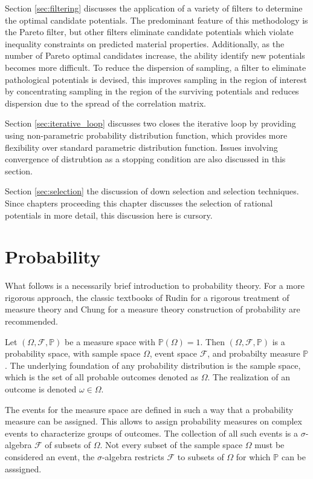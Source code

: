 Section \ref{sec:filtering} discusses the application of a variety of filters to determine the optimal candidate potentials.  The predominant feature of this methodology is the Pareto filter, but other filters eliminate candidate potentials which violate inequality constraints on predicted material properties.  Additionally, as the number of Pareto optimal candidates increase, the ability identify new potentials becomes more difficult.  To reduce the dispersion of sampling, a filter to eliminate pathological potentials is devised, this improves sampling in the region of interest by concentrating sampling in the region of the surviving potentials and reduces dispersion due to the spread of the correlation matrix.

Section \ref{sec:iterative_loop} discusses two closes the iterative loop by providing using non-parametric probability distribution function, which provides more flexibility over standard parametric distribution function.  Issues involving convergence of distrubtion as a stopping condition are also discussed in this section.

Section \ref{sec:selection} the discussion of down selection and selection techniques.  Since chapters proceeding this chapter discusses the selection of rational potentials in more detail, this discussion here is cursory.

\section{Probability}
\label{sec:probability}
What follows is a necessarily brief introduction to probability theory.  For a more rigorous approach, the classic textbooks of Rudin\cite{rudin1987_realanalysis} for a rigorous treatment of measure theory and Chung\cite{chung2001_probabilitytheory} for a measure theory construction of probability are recommended.

Let $(\Omega,\mathcal{F},\mathbb{P})$ be a measure space with $\mathbb{P}(\Omega)=1$.  Then $(\Omega,\mathcal{F},\mathbb{P})$ is a probability space, with sample space $\Omega$, event space $\mathcal{F}$, and probabilty measure $\mathbb{P}$.  The underlying foundation of any probability distribution is the sample space, which is the set of all probable outcomes denoted as $\Omega$.  The realization of an outcome is denoted $\omega \in \Omega$.

The events for the measure space are defined in such a way that a probability measure can be assigned.  This allows to assign probability measures on complex events to characterize groups of outcomes.  The collection of all such events is a $\sigma$-algebra $\mathcal{F}$ of subsets of $\Omega$.  Not every subset of the sample space $\Omega$ must be considered an event, the $\sigma$-algebra restricts $\mathcal{F}$ to subsets of $\Omega$ for which $\mathbb{P}$ can be asssigned.

